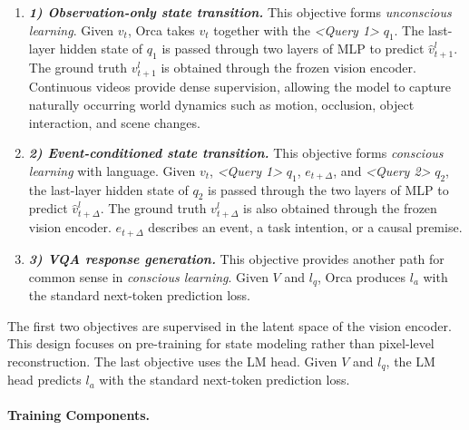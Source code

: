 \documentclass{llmxive}
\begin{document}
\vspace{-1ex}
\begin{enumerate}[leftmargin=1.35em, itemsep=0.35em, topsep=0.35em, parsep=0em]
    \item[] \textbf{\textit{1) Observation-only state transition.}} This objective forms \textit{unconscious learning}. Given \(v_t\), Orca takes \(v_t\) together with the \textit{<Query 1>} \(q_1\). The last-layer hidden state of \(q_1\) is passed through two layers of MLP to predict $\hat{v}^l_{t+1}$. The ground truth $v^l_{t+1}$ is obtained through the frozen vision encoder. Continuous videos provide dense supervision, allowing the model to capture naturally occurring world dynamics such as motion, occlusion, object interaction, and scene changes.
  
    \item[] \textbf{\textit{2) Event-conditioned state transition.}} This objective forms \textit{conscious learning} with language. Given \(v_t\), \textit{<Query 1>} \(q_1\), $e_{t+\Delta}$, and \textit{<Query 2>} \(q_2\), the last-layer hidden state of \(q_2\) is passed through the two layers of MLP to predict $\hat{v}^l_{t+\Delta}$. The ground truth $v^l_{t+\Delta}$ is also obtained through the frozen vision encoder. $e_{t+\Delta}$ describes an event, a task intention, or a causal premise. 

    \item[] \textbf{\textit{3) VQA response generation.}} This objective provides another path for common sense in \textit{conscious learning}. Given $V$ and $l_q$, Orca produces $l_a$ with the standard next-token prediction loss.
\end{enumerate}

The first two objectives are supervised in the latent space of the vision encoder. This design focuses on pre-training for state modeling rather than pixel-level reconstruction. The last objective uses the LM head. Given $V$ and $l_q$, the LM head predicts $l_a$ with the standard next-token prediction loss. 



\paragraph{Training Components.}
\end{document}
